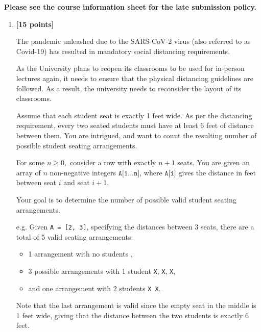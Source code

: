 \documentclass{assignment-373}
\begin{document}
\think

\textbf{Please see the course information sheet for the late submission
  policy.}

\begin{enumerate}
\item \textbf{[15 points]}

  The pandemic unleashed due to the SARS-CoV-2 virus (also referred to
  as Covid-19) has resulted in mandatory social distancing
  requirements.

  As the University plans to reopen its classrooms to be used for
  in-person lectures again, it needs to ensure that the physical
  distancing guidelines are followed. 
  As a result, the university needs to reconsider the layout of its
  classrooms.

  Assume that each student seat is exactly 1 feet wide.
  As per the distancing requirement, every two seated students must
  have at least 6 feet of distance between them.
  You are intrigued, and want to count the resulting number of
  possible student seating arrangements.

  For some $n \ge 0,$ consider a row with exactly $n+1$ seats.
  You are given an array of $n$ non-negative integers
  $\texttt{A[1...n]}$, where $\texttt{A[i]}$ gives the distance in feet
  between seat $i$ and seat $i+1.$

  Your goal is to determine the number of possible valid student
  seating arrangements.

  e.g. Given \texttt{A = [2, 3]}, specifying the distances between 3
  seats, there are a total of 5 valid seating arrangements:
  \begin{itemize}
  \item 1 arrangement with no students
    \texttt{\textvisiblespace\textvisiblespace\textvisiblespace}, 
  \item 3 possible arrangements with 1 student
    \texttt{X\textvisiblespace\textvisiblespace},
    \texttt{\textvisiblespace X\textvisiblespace},
    \texttt{\textvisiblespace\textvisiblespace X}, 
  \item and one arrangement with 2 students \texttt{X\textvisiblespace
      X}.
  \end{itemize}
  Note that the last arrangement is valid since the empty seat in the
  middle is 1 feet wide, giving that the distance between the two
  students is exactly 6 feet.


\end{enumerate}
\end{document}
